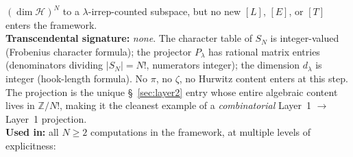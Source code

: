 \documentclass[11pt]{article}
\begin{document}
$(\dim\mathcal{H})^N$ to a $\lambda$-irrep-counted subspace, but no
new $[L]$, $[E]$, or $[T]$ enters the framework.\\
\textbf{Transcendental signature:} \textit{none}.  The character
table of $S_N$ is integer-valued (Frobenius character formula); the
projector $P_\lambda$ has rational matrix entries (denominators
dividing $|S_N| = N!$, numerators integer); the dimension $d_\lambda$
is integer (hook-length formula).  No $\pi$, no $\zeta$, no Hurwitz
content enters at this step.  The projection is the unique
\S~\ref{sec:layer2} entry whose entire algebraic content lives in
$\mathbb{Z}/N!$, making it the cleanest example of a
\emph{combinatorial} Layer~1 $\to$ Layer~1 projection.\\
\textbf{Used in:} all $N \geq 2$ computations in the framework, at
multiple levels of explicitness:
\end{document}
